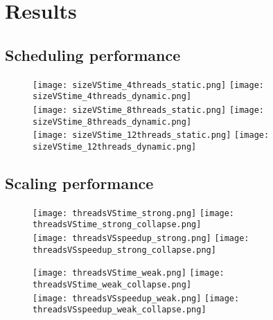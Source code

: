 \section{Results}\label{sec:result}

\subsection{Scheduling performance}\label{sec:sched}

\begin{figure}[h!]
    \centering
    \null\hfill
    \texttt{[image: sizeVStime\_4threads\_static.png]}
    \null\hfill
    \texttt{[image: sizeVStime\_4threads\_dynamic.png]}
    \null\hfill
    \\
    \null\hfill
    \texttt{[image: sizeVStime\_8threads\_static.png]}
    \null\hfill
    \texttt{[image: sizeVStime\_8threads\_dynamic.png]}
    \null\hfill
    \\
    \null\hfill
    \texttt{[image: sizeVStime\_12threads\_static.png]}
    \null\hfill
    \texttt{[image: sizeVStime\_12threads\_dynamic.png]}
    \null\hfill
    \caption{\label{fig:sched}}
\end{figure}

\subsection{Scaling performance}\label{sec:scale}

\begin{figure}[h!]
    \centering
    \null\hfill
    \texttt{[image: threadsVStime\_strong.png]}
    \null\hfill
    \texttt{[image: threadsVStime\_strong\_collapse.png]}
    \null\hfill
    \\
    \null\hfill
    \texttt{[image: threadsVSspeedup\_strong.png]}
    \null\hfill
    \texttt{[image: threadsVSspeedup\_strong\_collapse.png]}
    \null\hfill
    \caption{\label{fig:strong_scale}}
\end{figure}

\begin{figure}[h!]
    \centering
    \null\hfill
    \texttt{[image: threadsVStime\_weak.png]}
    \null\hfill
    \texttt{[image: threadsVStime\_weak\_collapse.png]}
    \null\hfill
    \\
    \null\hfill
    \texttt{[image: threadsVSspeedup\_weak.png]}
    \null\hfill
    \texttt{[image: threadsVSspeedup\_weak\_collapse.png]}
    \null\hfill
    \caption{\label{fig:strong_scale}}
\end{figure}
